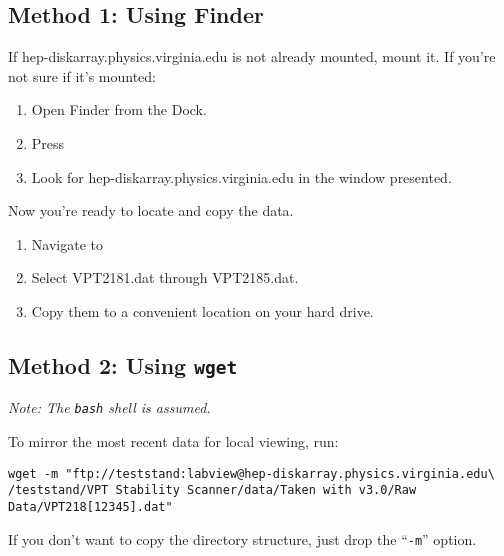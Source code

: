 \subsection{Method 1: Using Finder}
\label{sec:op_start:data:finder}

If \textsf{hep-diskarray.physics.virginia.edu} is not already mounted, mount it.  If you're not sure if it's mounted:
\begin{enumerate}
\item Open \textsf{Finder} from the Dock.
\item Press 
\item Look for \textsf{hep-diskarray.physics.virginia.edu} in the window presented.
\end{enumerate}

Now you're ready to locate and copy the data.
\begin{enumerate}
\item Navigate to 
\item Select \textsf{VPT2181.dat} through \textsf{VPT2185.dat}.
\item Copy them to a convenient location on your hard drive.
\end{enumerate}


\subsection{Method 2: Using \texttt{wget}}
\label{sec:op_start:data:wget}
\textit{Note: The \texttt{bash} shell is assumed.}

To mirror the most recent data for local viewing, run:
\begin{verbatim}
wget -m "ftp://teststand:labview@hep-diskarray.physics.virginia.edu\
/teststand/VPT Stability Scanner/data/Taken with v3.0/Raw Data/VPT218[12345].dat"
\end{verbatim}

If you don't want to copy the directory structure, just drop the ``\texttt{-m}'' option.
